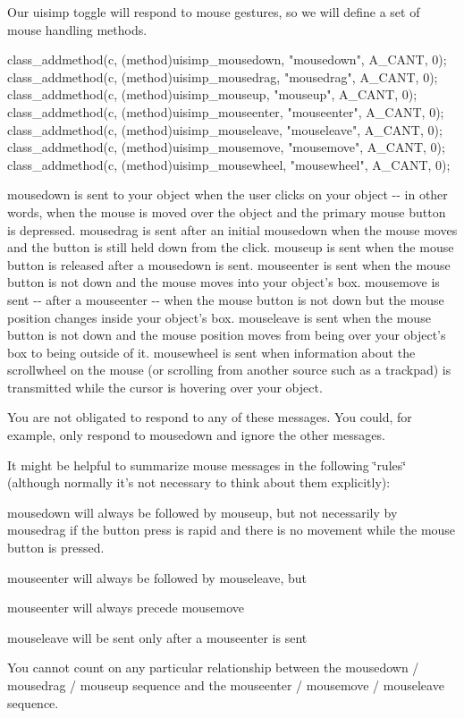 Our uisimp toggle will respond to mouse gestures, so we will define a set of mouse handling methods.


\begin{DoxyCode}
    class_addmethod(c, (method)uisimp_mousedown,    "mousedown",    A_CANT, 0);
    class_addmethod(c, (method)uisimp_mousedrag,    "mousedrag",    A_CANT, 0);
    class_addmethod(c, (method)uisimp_mouseup,      "mouseup",      A_CANT, 0);
    class_addmethod(c, (method)uisimp_mouseenter,   "mouseenter",   A_CANT, 0);
    class_addmethod(c, (method)uisimp_mouseleave,   "mouseleave",   A_CANT, 0);
    class_addmethod(c, (method)uisimp_mousemove,    "mousemove",    A_CANT, 0);
    class_addmethod(c, (method)uisimp_mousewheel,   "mousewheel",   A_CANT, 0);
\end{DoxyCode}


mousedown is sent to your object when the user clicks on your object -\/-\/ in other words, when the mouse is moved over the object and the primary mouse button is depressed. mousedrag is sent after an initial mousedown when the mouse moves and the button is still held down from the click. mouseup is sent when the mouse button is released after a mousedown is sent. mouseenter is sent when the mouse button is not down and the mouse moves into your object's box. mousemove is sent -\/-\/ after a mouseenter -\/-\/ when the mouse button is not down but the mouse position changes inside your object's box. mouseleave is sent when the mouse button is not down and the mouse position moves from being over your object's box to being outside of it. mousewheel is sent when information about the scrollwheel on the mouse (or scrolling from another source such as a trackpad) is transmitted while the cursor is hovering over your object.

You are not obligated to respond to any of these messages. You could, for example, only respond to mousedown and ignore the other messages.

It might be helpful to summarize mouse messages in the following \char`\"{}rules\char`\"{} (although normally it's not necessary to think about them explicitly):


\begin{DoxyItemize}
\item mousedown will always be followed by mouseup, but not necessarily by mousedrag if the button press is rapid and there is no movement while the mouse button is pressed.
\item mouseenter will always be followed by mouseleave, but
\item mouseenter will always precede mousemove
\item mouseleave will be sent only after a mouseenter is sent
\item You cannot count on any particular relationship between the mousedown / mousedrag / mouseup sequence and the mouseenter / mousemove / mouseleave sequence.
\end{DoxyItemize}

